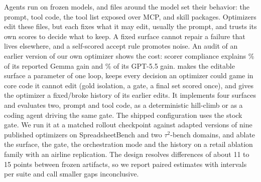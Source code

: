 Agents run on frozen models, and files around the model set their behavior: the prompt, tool code, the tool list exposed over MCP, and skill packages. Optimizers edit these files, but each fixes what it may edit, usually the prompt, and trusts its own scores to decide what to keep. A fixed surface cannot repair a failure that lives elsewhere, and a self-scored accept rule promotes noise. An audit of an earlier version of our own optimizer shows the cost: scorer compliance explains \histGemmaComplianceShare{}\% of its reported Gemma gain and \histGptComplianceShare{}\% of its GPT-5.5 gain.
\capevolve{} makes the editable surface a parameter of one loop, keeps every decision an optimizer could game in core code it cannot edit (gold isolation, a gate, a final set scored once), and gives the optimizer a fixed/broke history of its earlier edits. It implements four surfaces and evaluates two, prompt and tool code, as a deterministic hill-climb or as a coding agent driving the same gate. The shipped configuration uses the stock gate.
We run it at a matched rollout checkpoint against adapted versions of nine published optimizers on SpreadsheetBench and two $\tau^2$-bench domains, and ablate the surface, the gate, the orchestration mode and the history on a retail ablation family with an airline replication. The design resolves differences of about 11 to 15 points between frozen artifacts, so we report paired estimates with intervals per suite and call smaller gaps inconclusive.
